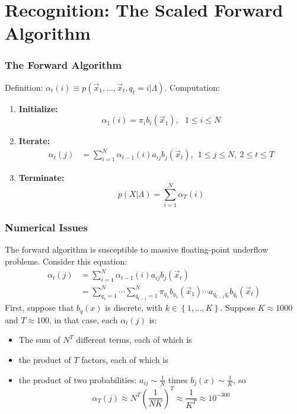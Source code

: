 \documentclass{beamer}
\begin{document}
\section[Recognition]{Recognition: The Scaled Forward Algorithm}
\setcounter{subsection}{1}

\begin{frame}
  \frametitle{The Forward Algorithm}

  Definition: $\alpha_t(i) \equiv p(\vec{x}_1,\ldots,\vec{x}_t,q_t=i|\Lambda)$.  Computation:
  \begin{enumerate}
  \item {\bf Initialize:}
    \[
    \alpha_1(i) = \pi_i b_i(\vec{x}_1),~~~1\le i\le N
    \]
  \item {\bf Iterate:}
    \begin{align*}
      \alpha_{t}(j) &= \sum_{i=1}^N \alpha_{t-1}(i) a_{ij}b_j(\vec{x}_t),~~1\le j\le N,~2\le t\le T
    \end{align*}
  \item {\bf Terminate:}
    \[
    p(X|\Lambda) = \sum_{i=1}^N \alpha_T(i)
    \]
  \end{enumerate}
\end{frame}


\begin{frame}
  \frametitle{Numerical Issues}

  The forward algorithm is susceptible to massive floating-point
  underflow problems. Consider this equation:
  \begin{align*}
    \alpha_{t}(j) &= \sum_{i=1}^N \alpha_{t-1}(i) a_{ij}b_j(\vec{x}_t)\\
    &= \sum_{q_1=1}^N\cdots\sum_{q_{t-1}=1}^N \pi_{q_1}b_{q_1}(\vec{x}_1)\cdots
    a_{q_{t-1}q_{t}}b_{q_t}(\vec{x}_t)
  \end{align*}
  First, suppose that $b_q(x)$ is discrete, with
  $k\in\left\{1,\ldots,K\right\}$.  Suppose $K\approx 1000$ and
  $T\approx 100$, in that case, each $\alpha_t(j)$ is:
  \begin{itemize}
  \item The sum of $N^T$ different terms, each of which is
  \item the product of $T$ factors, each of which is
  \item the product of two probabilities: $a_{ij}\sim\frac{1}{N}$ times
    $b_j(x)\sim\frac{1}{K}$, so
    \begin{displaymath}
      \alpha_T(j) \approx N^T\left(\frac{1}{NK}\right)^{T} \approx \frac{1}{K^T}\approx 10^{-300}
    \end{displaymath}
  \end{itemize}
\end{frame}
\end{document}

